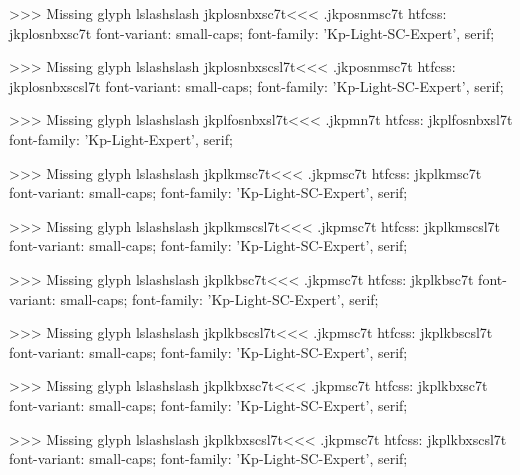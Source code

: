 >>>
Missing glyph	lslashslash
\<jkplosnbxsc7t\><<<
.jkposnmsc7t
htfcss:  jkplosnbxsc7t  font-variant: small-caps; font-family: 'Kp-Light-SC-Expert', serif;

>>>
Missing glyph	lslashslash
\<jkplosnbxscsl7t\><<<
.jkposnmsc7t
htfcss:  jkplosnbxscsl7t  font-variant: small-caps; font-family: 'Kp-Light-SC-Expert', serif;

>>>
Missing glyph	lslashslash
\<jkplfosnbxsl7t\><<<
.jkpmn7t
htfcss:  jkplfosnbxsl7t  font-family: 'Kp-Light-Expert', serif;

>>>
Missing glyph	lslashslash
\<jkplkmsc7t\><<<
.jkpmsc7t
htfcss:  jkplkmsc7t  font-variant: small-caps; font-family: 'Kp-Light-SC-Expert', serif;

>>>
Missing glyph	lslashslash
\<jkplkmscsl7t\><<<
.jkpmsc7t
htfcss:  jkplkmscsl7t  font-variant: small-caps; font-family: 'Kp-Light-SC-Expert', serif;

>>>
Missing glyph	lslashslash
\<jkplkbsc7t\><<<
.jkpmsc7t
htfcss:  jkplkbsc7t  font-variant: small-caps; font-family: 'Kp-Light-SC-Expert', serif;

>>>
Missing glyph	lslashslash
\<jkplkbscsl7t\><<<
.jkpmsc7t
htfcss:  jkplkbscsl7t  font-variant: small-caps; font-family: 'Kp-Light-SC-Expert', serif;

>>>
Missing glyph	lslashslash
\<jkplkbxsc7t\><<<
.jkpmsc7t
htfcss:  jkplkbxsc7t  font-variant: small-caps; font-family: 'Kp-Light-SC-Expert', serif;

>>>
Missing glyph	lslashslash
\<jkplkbxscsl7t\><<<
.jkpmsc7t
htfcss:  jkplkbxscsl7t  font-variant: small-caps; font-family: 'Kp-Light-SC-Expert', serif;

